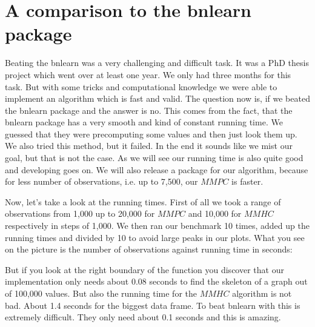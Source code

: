 \chapter{A comparison to the bnlearn package}

	Beating the bnlearn was a very challenging and difficult task. It was a PhD thesis project which went over at least one year. We only had three months for this task. But with some tricks and computational knowledge we were able to implement an algorithm which is fast and valid. The question now is, if we beated the bnlearn package and the answer is no. This comes from the fact, that the bnlearn package has a very smooth and kind of constant running time. We guessed that they were precomputing some values and then just look them up. We also tried this method, but it failed. In the end it sounds like we mist our goal, but that is not the case. As we will see our running time is also quite good and developing goes on. We will also release a package for our algorithm, because for less number of observations, i.e. up to 7,500, our $MMPC$ is faster.

	Now, let's take a look at the running times. First of all we took a range of observations from 1,000 up to 20,000 for $MMPC$ and 10,000 for $MMHC$ respectively in steps of 1,000. We then ran our benchmark 10 times, added up the running times and divided by 10 to avoid large peaks in our plots. What you see on the picture is the number of observations against running time in seconds:


	But if you look at the right boundary of the function you discover that our implementation only needs about 0.08 seconds to find the skeleton of a graph out of 100,000 values. But also the running time for the $MMHC$ algorithm is not bad. About 1.4 seconds for the biggest data frame. To beat bnlearn with this is extremely difficult. They only need about 0.1 seconds and this is amazing.




